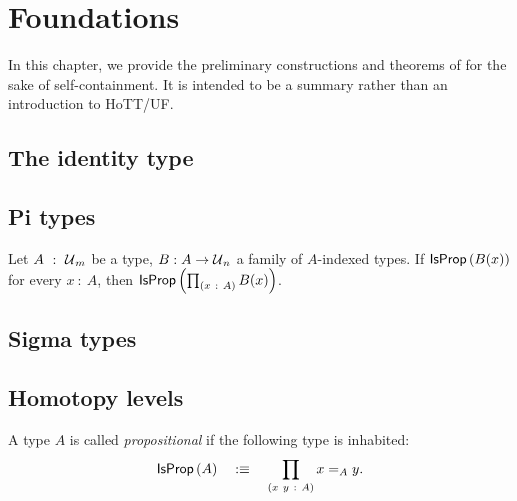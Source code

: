 \chapter{Foundations}\label{chap:foundations}

In this chapter, we provide the preliminary constructions and theorems of \UF{} for the
sake of self-containment. It is intended to be a summary rather than an introduction to
HoTT/UF.

\section{The identity type}


\section{Pi types}


\begin{prop}\label{prop:pi-prop}
  Let $A~:~\mathcal{U}{}_m$ be a type, $B : A \rightarrow \mathcal{U}{}_n$ a family of $A$-indexed types. If
  $\mathsf{IsProp}\left(B(x)\right)$ for every $x~:~A$, then $\mathsf{IsProp}\left(\prod_{(x~:~A)} B(x)\right)$.
\end{prop}

\section{Sigma types}


\section{Homotopy levels}

\begin{defn}[Proposition]
  A type $A$ is called \emph{propositional} if the following type is inhabited:
  \begin{equation*}
    \mathsf{IsProp}\left(A\right) \quad:\equiv\quad \prod_{(x~y~:~A)} x =_A y.
  \end{equation*}
\end{defn}

